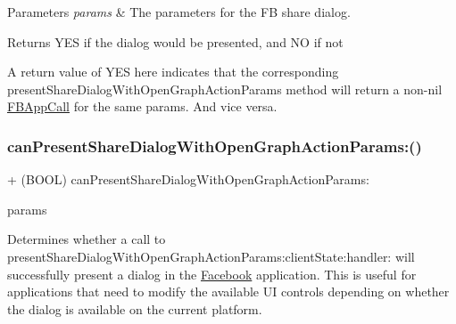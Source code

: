 \begin{DoxyParams}{Parameters}
{\em params} & The parameters for the FB share dialog.\\
\hline
\end{DoxyParams}
\begin{DoxyReturn}{Returns}
Y\+ES if the dialog would be presented, and NO if not
\end{DoxyReturn}
A return value of Y\+ES here indicates that the corresponding present\+Share\+Dialog\+With\+Open\+Graph\+Action\+Params method will return a non-\/nil \hyperlink{interfaceFBAppCall}{F\+B\+App\+Call} for the same params. And vice versa. \mbox{\label{interfaceFBDialogs_ad8921a3906d28210cad0c0871e99f4bd}} 
\subsubsection{\texorpdfstring{can\+Present\+Share\+Dialog\+With\+Open\+Graph\+Action\+Params\+:()}{canPresentShareDialogWithOpenGraphActionParams:()}\hspace{0.1cm}{\footnotesize\ttfamily [3/5]}}
{\footnotesize\ttfamily + (B\+O\+OL) can\+Present\+Share\+Dialog\+With\+Open\+Graph\+Action\+Params\+: \begin{DoxyParamCaption}\item[{(\hyperlink{interfaceFBOpenGraphActionParams}{F\+B\+Open\+Graph\+Action\+Params} $\ast$)}]{params }\end{DoxyParamCaption}}

Determines whether a call to present\+Share\+Dialog\+With\+Open\+Graph\+Action\+Params\+:client\+State\+:handler\+: will successfully present a dialog in the \hyperlink{interfaceFacebook}{Facebook} application. This is useful for applications that need to modify the available UI controls depending on whether the dialog is available on the current platform.


